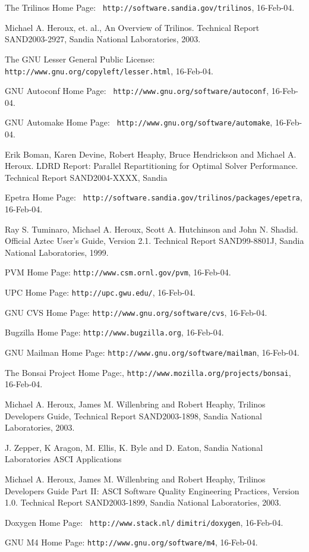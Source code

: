 \documentclass[]{llncs}      %
\begin{document}
\begin{thebibliography}{10}

 The Trilinos Home Page: {\tt
http://software.sandia.gov/trilinos}, 16-Feb-04.


 Michael A. Heroux, et. al., An Overview of
 Trilinos. Technical Report SAND2003-2927, Sandia National Laboratories,
 2003.

 The GNU Lesser General Public License: {\tt
http://www.gnu.org/copyleft/lesser.html}, 16-Feb-04.

 GNU Autoconf Home Page: {\tt
 http://www.gnu.org/software/autoconf}, 16-Feb-04.

 GNU Automake Home Page: {\tt
 http://www.gnu.org/software/automake}, 16-Feb-04.

 Erik Boman, Karen Devine, Robert Heaphy, Bruce Hendrickson
 and Michael A. Heroux. LDRD Report: Parallel Repartitioning for Optimal
 Solver Performance. Technical Report SAND2004-XXXX, Sandia

 Epetra Home Page: {\tt
 http://software.sandia.gov/trilinos/packages/epetra}, 16-Feb-04.

 Ray S. Tuminaro, Michael A. Heroux, Scott A. Hutchinson and
 John N. Shadid. Official Aztec User’s Guide, Version 2.1. Technical
 Report SAND99-8801J, Sandia National Laboratories, 1999.

 PVM Home Page: {\tt http://www.csm.ornl.gov/pvm}, 16-Feb-04.

 UPC Home Page: {\tt http://upc.gwu.edu/}, 16-Feb-04.

 GNU CVS Home Page: {\tt http://www.gnu.org/software/cvs},
 16-Feb-04.

 Bugzilla Home Page: {\tt http://www.bugzilla.org},
 16-Feb-04.

 GNU Mailman Home Page: {\tt http://www.gnu.org/software/mailman}, 16-Feb-04.

 The Bonsai Project Home Page:,
 {\tt http://www.mozilla.org/projects/bonsai}, 16-Feb-04.

 Michael A. Heroux, James M. Willenbring and Robert Heaphy,
 Trilinos Developers Guide, Technical Report SAND2003-1898, Sandia
 National Laboratories, 2003.

 J. Zepper, K Aragon, M. Ellis, K. Byle and D. Eaton, Sandia
 National Laboratories ASCI Applications

 Michael A. Heroux, James M. Willenbring and Robert Heaphy,
 Trilinos Developers Guide Part II: ASCI Software Quality Engineering
 Practices, Version 1.0. Technical Report SAND2003-1899, Sandia National
 Laboratories, 2003.

 Doxygen Home Page: {\tt
 http://www.stack.nl/$~$dimitri/doxygen}, 16-Feb-04.

 GNU M4 Home Page: {\tt http://www.gnu.org/software/m4},
 16-Feb-04.

\end{thebibliography}
\end{document}
